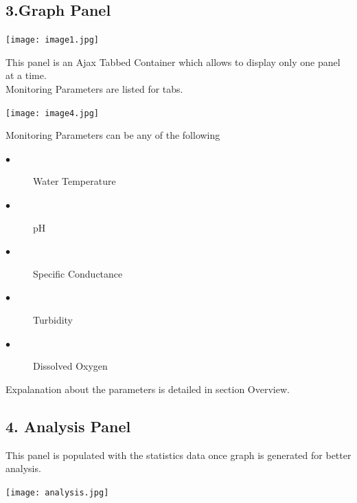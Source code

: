 \documentclass[a4paper]{article}
\begin{document}
\subsection*{3.Graph Panel}
\begin{center}
\texttt{[image: image1.jpg]}
\end{center}
{\normalsize This panel is an Ajax Tabbed Container which allows to display only one panel at a time.\\
Monitoring Parameters are listed for tabs.}
\bigskip
\begin{center}
\texttt{[image: image4.jpg]}
\end{center}
{\normalsize Monitoring Parameters can be any of the following
\begin{description}
  \item[$\bullet$ ] Water Temperature
  \item[$\bullet$ ] pH
   \item[$\bullet$ ] Specific Conductance
   \item[$\bullet$ ] Turbidity
   \item[$\bullet$ ]  Dissolved Oxygen
\end{description}
Expalanation about the parameters is detailed in section Overview.
}
\subsection*{4. Analysis Panel}
{\normalsize This panel is populated with the statistics data once graph is generated for better analysis.}
\begin{center}
\texttt{[image: analysis.jpg]}
\end{center}
\end{document}
